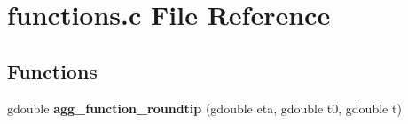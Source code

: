 \section{functions.\+c File Reference}
\label{functions_8c}
\subsection*{Functions}
{\bf }\par
\begin{DoxyCompactItemize}
\item 
gdouble {\bf agg\+\_\+function\+\_\+roundtip} (gdouble eta, gdouble t0, gdouble t)
\end{DoxyCompactItemize}

